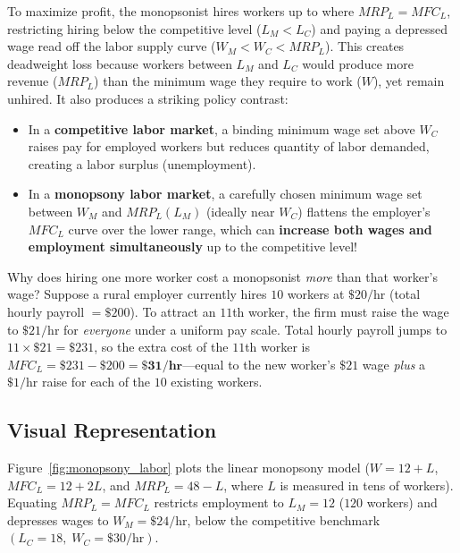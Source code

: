 \documentclass[11pt,letterpaper]{article}
\begin{document}
To maximize profit, the monopsonist hires workers up to where $MRP_L = MFC_L$, restricting hiring below the competitive level ($L_M < L_C$) and paying a depressed wage read off the labor supply curve ($W_M < W_C < MRP_L$). This creates deadweight loss because workers between $L_M$ and $L_C$ would produce more revenue ($MRP_L$) than the minimum wage they require to work ($W$), yet remain unhired. It also produces a striking policy contrast:
\begin{itemize}
    \item In a \textbf{competitive labor market}, a binding minimum wage set above $W_C$ raises pay for employed workers but reduces quantity of labor demanded, creating a labor surplus (unemployment).
    \item In a \textbf{monopsony labor market}, a carefully chosen minimum wage set between $W_M$ and $MRP_L(L_M)$ (ideally near $W_C$) flattens the employer's $MFC_L$ curve over the lower range, which can \textbf{increase both wages and employment simultaneously} up to the competitive level!
\end{itemize}

\begin{tcolorbox}[colback=CourseAmber!12!white,colframe=CourseOrange!85!black,title=\textbf{Clear It Up: Why Marginal Factor Cost Exceeds the Wage ($MFC_L > W$)}]
Why does hiring one more worker cost a monopsonist \emph{more} than that worker's wage? Suppose a rural employer currently hires $10$ workers at $\$20/\text{hr}$ (total hourly payroll $= \$200$). To attract an $11$th worker, the firm must raise the wage to $\$21/\text{hr}$ for \emph{everyone} under a uniform pay scale. Total hourly payroll jumps to $11 \times \$21 = \$231$, so the extra cost of the $11$th worker is $MFC_L = \$231 - \$200 = \mathbf{\$31/\text{hr}}$---equal to the new worker's $\$21$ wage \emph{plus} a $\$1/\text{hr}$ raise for each of the $10$ existing workers.
\end{tcolorbox}

\subsection*{Visual Representation}
Figure~\ref{fig:monopsony_labor} plots the linear monopsony model ($W = 12 + L$, $MFC_L = 12 + 2L$, and $MRP_L = 48 - L$, where $L$ is measured in tens of workers). Equating $MRP_L = MFC_L$ restricts employment to $L_M = 12$ ($120$ workers) and depresses wages to $W_M = \$24/\text{hr}$, below the competitive benchmark $(L_C = 18,\; W_C = \$30/\text{hr})$.
\end{document}
